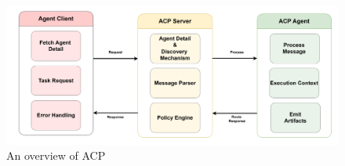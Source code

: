 \documentclass{article}
\begin{document}



\begin{figure}
    \centering
    \includegraphics[width=\linewidth]{acp.png}
    \caption{An overview of ACP}
    \label{fig:ACP}
\end{figure}


\end{document}
